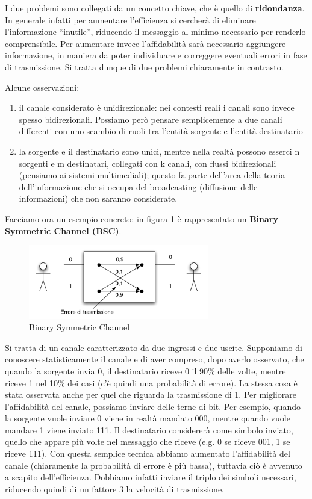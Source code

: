I due problemi sono collegati da un concetto chiave, che è quello di \textbf{ridondanza}. In generale infatti per aumentare l'efficienza si cercherà di eliminare l'informazione ``inutile'', riducendo il messaggio al minimo necessario per renderlo comprensibile. Per aumentare invece l'affidabilità sarà necessario aggiungere informazione, in maniera da poter individuare e correggere eventuali errori 
in fase di trasmissione.
Si tratta dunque di due problemi chiaramente in contrasto.

\noindent
Alcune osservazioni:
\begin{enumerate}
\item il canale considerato è unidirezionale: nei contesti reali i canali sono invece spesso bidirezionali. Possiamo però pensare semplicemente a due canali differenti con uno scambio di ruoli tra l'entità sorgente e l'entità destinatario
\item la sorgente e il destinatario sono unici, mentre nella realtà possono esserci n sorgenti e m destinatari, collegati con k canali, con flussi bidirezionali (pensiamo ai sistemi multimediali); questo fa parte dell'area della teoria dell'informazione che si occupa del broadcasting (diffusione delle informazioni) che non saranno considerate.
\end{enumerate}


Facciamo ora un esempio concreto: in figura \ref{fig:bsc} è rappresentato un \textbf{Binary Symmetric Channel (BSC)}.
\begin{figure}[htbp]
\begin{center}
	\includegraphics[width=0.7\textwidth]{img/bsc.pdf}
\caption{Binary Symmetric Channel}
\label{fig:bsc}
\end{center}
\end{figure}
Si tratta di un canale caratterizzato da due ingressi e due uscite. Supponiamo di conoscere statisticamente il canale e di aver 
compreso, dopo averlo osservato, che quando la sorgente invia 0, il destinatario riceve 0 il 90\% delle volte, mentre riceve 1 nel 10\% dei casi (c'è quindi una probabilità di errore). La stessa cosa è stata osservata anche per quel che riguarda la trasmissione di 1.
Per migliorare l'affidabilità del canale, possiamo inviare delle terne di bit. Per esempio, quando la sorgente vuole 
inviare 0 viene in realtà mandato 000, mentre quando vuole mandare 1 viene inviato 111. Il destinatario considererà come simbolo 
inviato, quello che appare più volte nel messaggio che riceve (e.g. 0 se riceve 001, 1 se riceve 111).
Con questa semplice tecnica abbiamo aumentato l'affidabilità del canale (chiaramente la probabilità di errore è più bassa), tuttavia 
ciò è avvenuto a scapito dell'efficienza. Dobbiamo infatti inviare il triplo dei simboli necessari, riducendo quindi di un fattore 3 
la velocità di trasmissione.

